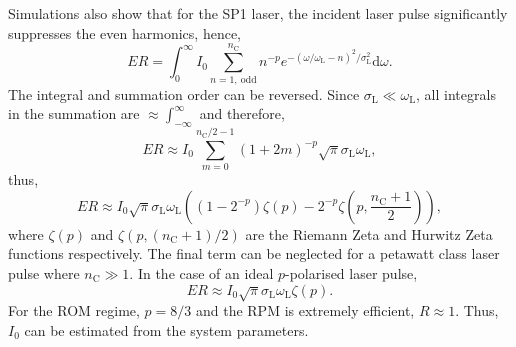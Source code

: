 Simulations also show that for the SP1 laser, the incident laser pulse significantly suppresses the even harmonics, hence,
\begin{equation}
	ER = \int^\infty_0 I_0 \sum^{n_\mathrm{C}}_{n=1,\ \mathrm{odd}}n^{-p}e^{-(\omega/\omega_\mathrm{L} - n)^2/\sigma^2_\mathrm{L}}\mathrm{d}\omega.
\end{equation}
The integral and summation order can be reversed. Since $\sigma_\mathrm{L} \ll \omega_\mathrm{L}$, all integrals in the summation are $\approx \int^\infty_{-\infty}$ and therefore,
\begin{equation}
	ER \approx I_0 \sum^{n_\mathrm{C}/2-1}_{m=0} (1+2m)^{-p} \sqrt{\pi}\sigma_\mathrm{L}\omega_\mathrm{L},
\end{equation}
thus,
\begin{equation}
	ER \approx I_0 \sqrt{\pi}\sigma_\mathrm{L}\omega_\mathrm{L} ((1-2^{-p})\zeta(p) - 2^{-p}\zeta(p,\frac{n_\mathrm{C} + 1}{2})),
\end{equation}
where $\zeta(p)$ and $\zeta(p,(n_\mathrm{C} + 1)/2)$ are the Riemann Zeta and Hurwitz Zeta functions respectively. The final term can be neglected for a petawatt class laser pulse where $n_\mathrm{C} \gg 1$. In the case of an ideal $p$-polarised laser pulse,
\begin{equation}
	ER \approx I_0 \sqrt{\pi}\sigma_\mathrm{L} \omega_\mathrm{L}\zeta(p).
\end{equation}
For the \ac{ROM} regime, $p = 8/3$ and the \ac{RPM} is extremely efficient, $R \approx 1$. Thus, $I_0$ can be estimated from the system parameters.

